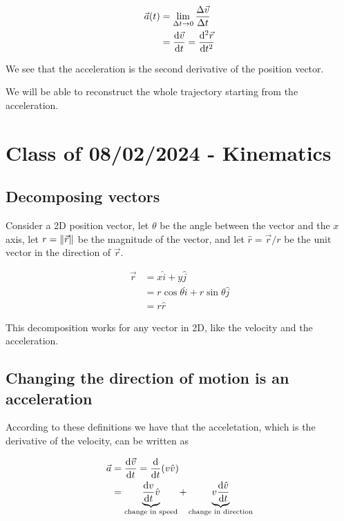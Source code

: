 \documentclass[14pt]{extarticle}
\begin{document}
\begin{align*}
  \vec{a}(t) & = \lim_{\Delta t \to 0} \frac{\Delta \vec{v}}{\Delta t} \\
             & = \dv{\vec{v}}{t} = \dv[2]{\vec{r}}{t}
\end{align*}

We see that the acceleration is the second derivative of the position vector.

We will be able to reconstruct the whole trajectory starting from the acceleration.

\section{Class of 08/02/2024 - Kinematics}

\subsection{Decomposing vectors}

Consider a 2D position vector, let $\theta$ be the angle between the vector and the $x$ axis,
let $r = \norm{\vec{r}}$ be the magnitude of the vector,
and let $\hat{r} = \vec{r} / r$ be the unit vector in the direction of $\vec{r}$.

\begin{align*}
  \vec{r} & = x \hat{i} + y \hat{j}                         \\
          & = r \cos \theta \hat{i} + r \sin \theta \hat{j} \\
          & = r \hat{r}
\end{align*}

This decomposition works for any vector in 2D, like the velocity and the acceleration.

\subsection{Changing the direction of motion is an acceleration}

According to these definitions we have that the acceletation, which is the derivative of the velocity, can be written as

\begin{align*}
  \vec{a} & = \dv{\vec{v}}{t} = \dv{t} (v \hat{v}) \\ &=
  \underbrace{ \dv{v}{t} \hat{v} }_{\text{change in speed}} +
  \underbrace{ v \dv{\hat{v}}{t} }_{\text{change in direction}}
\end{align*}
\end{document}
